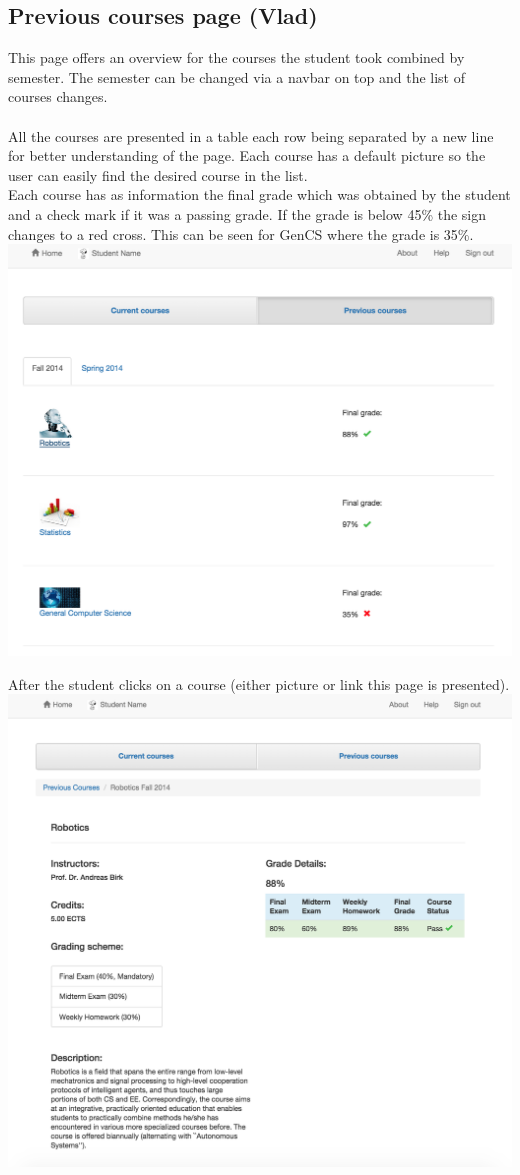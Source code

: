 \subsection{Previous courses page (Vlad)}

This page offers an overview for the courses the student took combined by semester. The semester can be changed via a navbar on top and the list of courses changes.\\\\
All the courses are presented in a table each row being separated by a new line for better understanding of the page. Each course has a default picture so the user can easily find the desired course in the list. \\
Each course has as information the final grade which was obtained by the student and a check mark if it was a passing grade. If the grade is below 45\% the sign changes to a red cross. This can be seen for GenCS where the grade is 35\%.\\
\includegraphics[width=.85\textwidth]{screenshots/PrevoiusCoursesOverview.png}

After the student clicks on a course (either picture or link this page is presented).\\

\includegraphics[width=.85\textwidth]{screenshots/PreviousCourseDetail.png}


